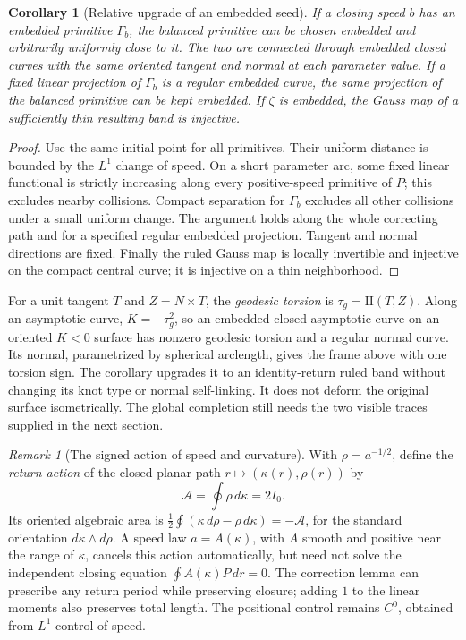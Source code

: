 \documentclass[11pt]{amsart}
\newtheorem{corollary}[theorem]{Corollary}
\theoremstyle{definition}
\theoremstyle{remark}
\newtheorem{remark}[theorem]{Remark}
\newcommand{\II}{\mathrm{II}}\newcommand{\Gmap}{\mathcal G}
\numberwithin{equation}{section}
\begin{document}
\begin{corollary}[Relative upgrade of an embedded seed]\label{cor:relative-holonomy-upgrade}
If a closing speed $b$ has an embedded primitive $\Gamma_b$, the balanced
primitive can be chosen embedded and arbitrarily uniformly close to it.
The two are connected through embedded closed curves with the same oriented
tangent and normal at each parameter value. If a fixed linear projection
of $\Gamma_b$ is a regular embedded curve, the same projection of the
balanced primitive can be kept embedded. If $\zeta$ is embedded, the Gauss map
of a sufficiently thin resulting band is injective.
\end{corollary}
\begin{proof}
Use the same initial point for all primitives. Their uniform distance is
bounded by the $L^1$ change of speed. On a short parameter arc, some fixed
linear functional is strictly increasing along every positive-speed
primitive of $P$; this excludes nearby collisions. Compact separation for
$\Gamma_b$ excludes all other collisions under a small uniform change.
The argument holds along the whole correcting path and for a specified
regular embedded projection. Tangent and normal directions are fixed.
Finally the ruled Gauss map is locally invertible and injective on the
compact central curve; it is injective on a thin neighborhood.
\end{proof}
For a unit tangent $T$ and $Z=N\times T$, the \emph{geodesic torsion}
is $\tau_g=\II(T,Z)$. Along an asymptotic curve,
$K=-\tau_g^2$, so an embedded closed asymptotic curve on an oriented
$K<0$ surface has nonzero geodesic torsion \cite[\S2.2]{GR} and a
regular normal curve. Its normal, parametrized by
spherical arclength, gives the frame above with one torsion sign. The
corollary upgrades it to an identity-return ruled band without changing
its knot type or normal self-linking. It does not deform the original
surface isometrically. The global completion still needs the two visible
traces supplied in the next section.

\begin{remark}[The signed action of speed and curvature]\label{rem:holonomy-action}
With $\rho=a^{-1/2}$, define the \emph{return action} of the closed
planar path $r\mapsto(\kappa(r),\rho(r))$ by
\[
 \mathscr A=\oint\rho\,d\kappa=2I_0.
\]
Its oriented algebraic area is
$\tfrac12\oint(\kappa\,d\rho-\rho\,d\kappa)=-\mathscr A$,
for the standard orientation $d\kappa\wedge d\rho$.
A speed law $a=A(\kappa)$, with $A$ smooth and positive near the
range of $\kappa$, cancels
this action automatically, but need not solve the independent closing
equation $\oint A(\kappa)P\,dr=0$. The correction lemma can prescribe
any return period while preserving closure; adding $1$ to the linear
moments also preserves total length. The positional control remains
$C^0$, obtained from $L^1$ control of speed.
\end{remark}
\end{document}
